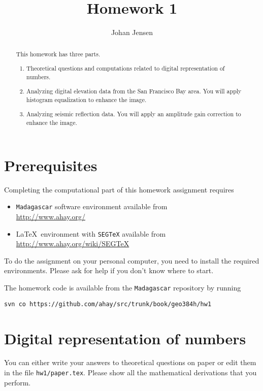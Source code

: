 \author{Johan Jensen}
\title{Homework 1}

\begin{abstract}
  This homework has three parts. 
  \begin{enumerate}
  \item Theoretical questions and computations related to digital representation of numbers.
  \item Analyzing digital elevation data from the San Francisco Bay area. You will apply 
  histogram equalization to enhance the image.
  \item Analyzing seismic reflection data. You will apply an amplitude gain 
  correction to enhance the image.
  \end{enumerate}
\end{abstract}

\section{Prerequisites}

Completing the computational part of this homework assignment requires
\begin{itemize}
\item \texttt{Madagascar} software environment available from \\
\url{http://www.ahay.org/}
\item \LaTeX\ environment with \texttt{SEGTeX} available from \\ 
\url{http://www.ahay.org/wiki/SEGTeX}
\end{itemize}
To do the assignment on your personal computer, you need to install
the required environments. Please ask for help if you don't know where
to start.

The homework code is available from the \texttt{Madagascar} repository
by running
\begin{verbatim}
svn co https://github.com/ahay/src/trunk/book/geo384h/hw1 
\end{verbatim}


\section{Digital representation of numbers}

You can either write your answers to theoretical questions on paper or
edit them in the file \verb#hw1/paper.tex#. Please show all the
mathematical derivations that you perform.

